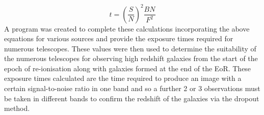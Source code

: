 \documentclass[pdf,color]{UoBnote}
\begin{document}
\newline
\begin{equation}
t = (\frac{S}{N})^2 \frac{BN}{F^2}
\end{equation}
\newline
A program was created to complete these calculations incorporating the above equations for various sources and provide the exposure times required for numerous telescopes. These values were then used to determine the suitability of the numerous telescopes for observing high redshift galaxies from the start of the epoch of re-ionisation along with galaxies formed at the end of the EoR. These exposure times calculated are the time required to produce an image with a certain signal-to-noise ratio in one band and so a further 2 or 3 observations must be taken in different bands to confirm the redshift of the galaxies via the dropout method.
\end{document}
